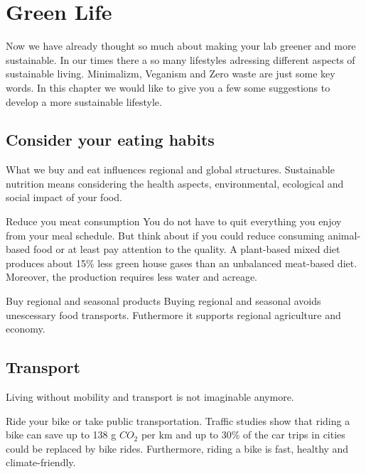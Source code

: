 
\chapter{Green Life}\label{chap:more}
Now we have already thought so much about making your lab greener and more sustainable. 
In our times there a so many lifestyles adressing different aspects of sustainable living. 
Minimalizm, Veganism and Zero waste are just some key words. 
In this chapter we would like to give you a few some suggestions to develop a more sustainable lifestyle.


\section{Consider your eating habits} 
 	What we buy and eat influences regional and global structures. 
 	Sustainable nutrition means considering the health aspects, environmental, ecological and social impact of your food. \cite{food}
 	
\begin{suggest}{Reduce you meat consumption}
 	You do not have to quit everything you enjoy from your meal schedule.
 	But think about if you could reduce consuming animal-based food or at least pay attention to the quality. 
 	A plant-based mixed diet produces about 15\% less green house gases than an unbalanced meat-based diet. Moreover, the production requires less water and acreage.
\end{suggest}
 	
\begin{suggest}{Buy regional and seasonal products}
  	Buying regional and seasonal avoids unescessary food transports. 
  	Futhermore it supports regional agriculture and economy. 
\end{suggest}

\section{Transport}
	Living without mobility and transport is not imaginable anymore. 
\begin{suggest}{Ride your bike or take public transportation.}
	Traffic studies show that riding a bike can save up to 138 g $CO_{2}$  per km and up to 30\% of the car trips in cities could be replaced by bike rides.\cite{bike}
	Furthermore, riding a bike is fast, healthy and climate-friendly. 
\end{suggest}

